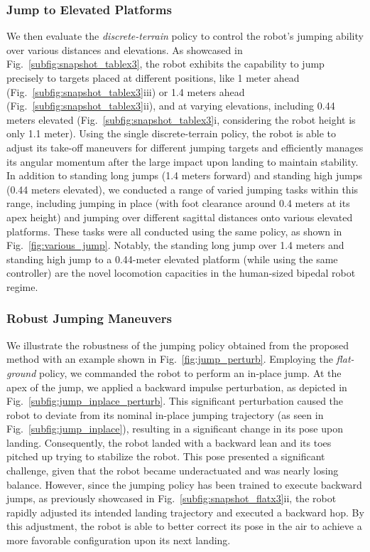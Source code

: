 \subsubsection{Jump to Elevated Platforms}
We then evaluate the \emph{discrete-terrain} policy to control the robot's jumping ability over various distances and elevations. 
As showcased in Fig.~\ref{subfig:snapshot_tablex3}, the robot exhibits the capability to jump precisely to targets placed at different positions, like 1 meter ahead (Fig.~\ref{subfig:snapshot_tablex3}iii) or 1.4 meters ahead (Fig.~\ref{subfig:snapshot_tablex3}ii), and at varying elevations, including 0.44 meters elevated (Fig.~\ref{subfig:snapshot_tablex3}i, considering the robot height is only 1.1 meter). 
Using the single discrete-terrain policy, the robot is able to adjust its take-off maneuvers for different jumping targets and efficiently manages its angular momentum after the large impact upon landing to maintain stability. 
In addition to standing long jumps (1.4 meters forward) and standing high jumps (0.44 meters elevated), we conducted a range of varied jumping tasks within this range, including jumping in place (with foot clearance around 0.4 meters at its apex height) and jumping over different sagittal distances onto various elevated platforms. 
These tasks were all conducted using the same policy, as shown in Fig.~\ref{fig:various_jump}.
Notably, the standing long jump over 1.4 meters and standing high jump to a 0.44-meter elevated platform (while using the same controller) are the novel locomotion capacities in the human-sized bipedal robot regime.


\subsubsection{Robust Jumping Maneuvers}
We illustrate the robustness of the jumping policy obtained from the proposed method with an example shown in Fig.~\ref{fig:jump_perturb}. Employing the \emph{flat-ground} policy, we commanded the robot to perform an in-place jump. 
At the apex of the jump, we applied a backward impulse perturbation, as depicted in Fig.~\ref{subfig:jump_inplace_perturb}.
This significant perturbation caused the robot to deviate from its nominal in-place jumping trajectory (as seen in Fig.~\ref{subfig:jump_inplace}), resulting in a significant change in its pose upon landing. Consequently, the robot landed with a backward lean and its toes pitched up trying to stabilize the robot. 
This pose presented a significant challenge, given that the robot became underactuated and was nearly losing balance.
However, since the jumping policy has been trained to execute backward jumps, as previously showcased in Fig.~\ref{subfig:snapshot_flatx3}ii, the robot rapidly adjusted its intended landing trajectory and executed a backward hop. By this adjustment, the robot is able to better correct its pose in the air to achieve a more favorable configuration upon its next landing. 

